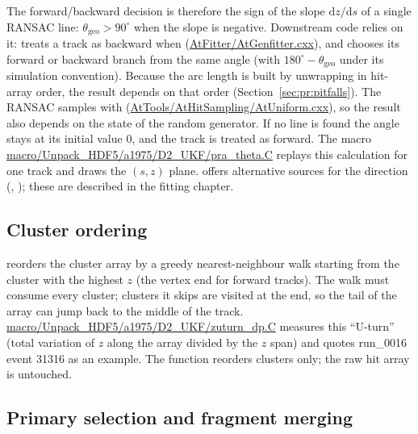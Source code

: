 The forward/backward decision is therefore the sign of the slope $\mathrm{d}z/\mathrm{d}s$ of a single
RANSAC line: $\theta_\mathrm{geo} > 90^\circ$ when the slope is negative. Downstream code relies on it:
 treats a track as backward when 
(\url{AtFitter/AtGenfitter.cxx}), and  chooses its forward or backward branch from the same angle (with $180^\circ -
\theta_\mathrm{geo}$ under its simulation convention). Because the arc length is built by unwrapping in
hit-array order, the result depends on that order (Section~\ref{sec:pr:pitfalls}). The RANSAC samples with
 (\url{AtTools/AtHitSampling/AtUniform.cxx}), so the result also depends on the state of the
random generator. If no line is found the angle stays at its initial value 0, and the track is treated as
forward. The macro \url{macro/Unpack_HDF5/a1975/D2_UKF/pra_theta.C} replays this calculation for one track
and draws the $(s,z)$ plane.  offers alternative sources for the direction
(, ); these are described in the fitting chapter.

\subsection{Cluster ordering}

 reorders the cluster array by a greedy nearest-neighbour walk
starting from the cluster with the highest $z$ (the vertex end for forward tracks). The walk must consume
every cluster; clusters it skips are visited at the end, so the tail of the array can jump back to the
middle of the track. \url{macro/Unpack_HDF5/a1975/D2_UKF/zuturn_dp.C} measures this ``U-turn'' (total
variation of $z$ along the array divided by the $z$ span) and quotes run\_0016 event 31316 as an example.
The function reorders clusters only; the raw hit array is untouched.

\subsection{Primary selection and fragment merging}
\label{sec:pr:selectmerge}

